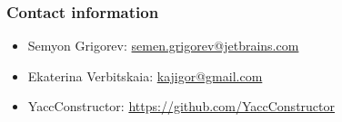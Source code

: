 \documentclass{beamer}
\begin{document}
\begin{frame}
\transwipe[direction=90]
\frametitle{Contact information}
\begin{itemize}
  \item Semyon Grigorev: \href{mailto:semen.grigorev@jetbrains.com}{semen.grigorev@jetbrains.com}
  \item Ekaterina Verbitskaia: \href{mailto:kajigor@gmail.com}{kajigor@gmail.com}
\end{itemize}
\begin{itemize}
  \item YaccConstructor: \href{https://github.com/YaccConstructor}{https://github.com/YaccConstructor}
\end{itemize}
\end{frame}
\end{document}
